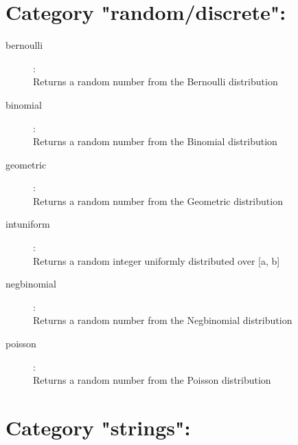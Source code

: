 \section{Category "random/discrete":}
\label{sec:ned-functions:category-random-discrete}

\begin{description}
\item[bernoulli]:  \\
    Returns a random number from the Bernoulli distribution
\item[binomial]:  \\
    Returns a random number from the Binomial distribution
\item[geometric]:  \\
    Returns a random number from the Geometric distribution
\item[intuniform]:  \\
    Returns a random integer uniformly distributed over [a, b]
\item[negbinomial]:  \\
    Returns a random number from the Negbinomial distribution
\item[poisson]:  \\
    Returns a random number from the Poisson distribution

\end{description}

\section{Category "strings":}
\label{sec:ned-functions:category-strings}


